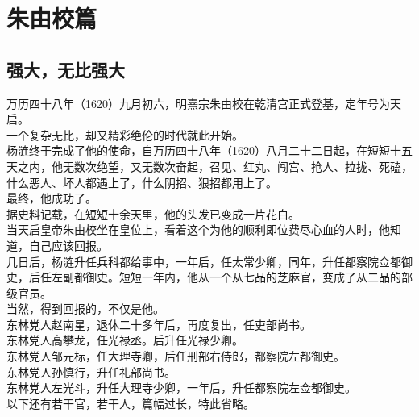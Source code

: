 \chapter*{朱由校篇}
\section{强大，无比强大}
\ifnum{}
	\begin{multicols}{\theparacolNo}
\fi
万历四十八年（1620）九月初六，明熹宗朱由校在乾清宫正式登基，定年号为天启。\\

一个复杂无比，却又精彩绝伦的时代就此开始。\\

杨涟终于完成了他的使命，自万历四十八年（1620）八月二十二日起，在短短十五天之内，他无数次绝望，又无数次奋起，召见、红丸、闯宫、抢人、拉拢、死磕，什么恶人、坏人都遇上了，什么阴招、狠招都用上了。\\

最终，他成功了。\\

据史料记载，在短短十余天里，他的头发已变成一片花白。\\

当天启皇帝朱由校坐在皇位上，看着这个为他的顺利即位费尽心血的人时，他知道，自己应该回报。\\

几日后，杨涟升任兵科都给事中，一年后，任太常少卿，同年，升任都察院佥都御史，后任左副都御史。短短一年内，他从一个从七品的芝麻官，变成了从二品的部级官员。\\

当然，得到回报的，不仅是他。\\

东林党人赵南星，退休二十多年后，再度复出，任吏部尚书。\\

东林党人高攀龙，任光禄丞。后升任光禄少卿。\\

东林党人邹元标，任大理寺卿，后任刑部右侍郎，都察院左都御史。\\

东林党人孙慎行，升任礼部尚书。\\

东林党人左光斗，升任大理寺少卿，一年后，升任都察院左佥都御史。\\

以下还有若干官，若干人，篇幅过长，特此省略。\\


\end{multicols}
